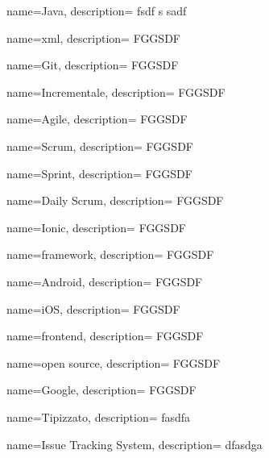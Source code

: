 {
  name=Java,
  description={ fsdf s sadf }
}

{
  name=xml,
  description={ FGGSDF }
}

{
  name=Git,
  description={ FGGSDF }
}

{
  name=Incrementale,
  description={ FGGSDF }
}

{
  name=Agile,
  description={ FGGSDF }
}

{
  name=Scrum,
  description={ FGGSDF }
}

{
  name=Sprint,
  description={ FGGSDF }
}

{
  name=Daily Scrum,
  description={ FGGSDF }
}

{
  name=Ionic,
  description={ FGGSDF }
}

{
  name=framework,
  description={ FGGSDF }
}

{
  name=Android,
  description={ FGGSDF }
}

{
  name=iOS,
  description={ FGGSDF }
}

{
  name=frontend,
  description={ FGGSDF }
}

{
  name=open source,
  description={ FGGSDF }
}

{
  name=Google,
  description={ FGGSDF }
}

{
  name=Tipizzato,
  description= { fasdfa }
}

{
  name=Issue Tracking System,
  description={ dfasdga }
}
